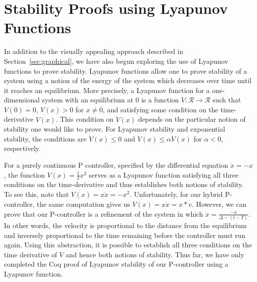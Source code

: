 \documentclass[preprint,nocopyrightspace]{sigplanconf}
\begin{document}



\section{Stability Proofs using Lyapunov Functions}
\label{sec:lyapunov-functions}

In addition to the visually appealing approach described in Section~\ref{sec:graphical}, we have also begun exploring the use of Lyapunov functions to prove stability. %
Lyapunov functions allow one to prove stability of a system using a notion of the energy of the system which decreases over time until it reaches an equilibrium.
More precisely, a Lyapunov function for a one-dimensional system with an equilibrium at 0 is a function $V : \mathcal{R} \rightarrow \mathcal{R}$ such that $V(0) = 0$, $V(x) > 0$ for $x \neq 0$, and satisfying some condition on the time-derivative $\dot{V(x)}$.
This condition on $\dot{V}(x)$ depends on the particular notion of stability one would like to prove.
For Lyapunov stability and exponential stability, the conditions are $\dot{V}(x) \leq 0$ and $\dot{V}(x) \leq \alpha V(x)$ for $\alpha < 0$, respectively.

For a purely continuous P controller, specified by the differential equation $\dot{x} = -x$, the function $V(x) = \frac{1}{2}x^2$ serves as a Lyapunov function satisfying all three conditions on the time-derivative and thus establishes both notions of stability.
To see this, note that $\dot{V(x)} = x\dot{x} = -x^2$.
Unfortunately, for our hybrid P-controller, the same computation gives us $\dot{V(x)} = x\dot{x} = x*v$.
However, we can prove that our P-controller is a refinement of the system in which $\dot{x} = \frac{-x}{\Delta - (t - T)}$.
In other words, the velocity is proportional to the distance from the equilibrium and inversely proportional to the time remaining before the controller must run again.
Using this abstraction, it is possible to establish all three conditions on the time derivative of $V$ and hence both notions of stability.
Thus far, we have only completed the Coq proof of Lyapunov stability of our P-controller using a Lyapunov function.
\end{document}
